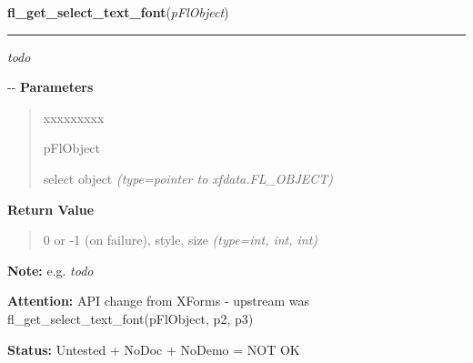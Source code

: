\hspace{.8\funcindent}\begin{boxedminipage}{\funcwidth}

    \raggedright \textbf{fl\_get\_select\_text\_font}(\textit{pFlObject})

    \vspace{-1.5ex}

    \rule{\textwidth}{0.5\fboxrule}
\setlength{\parskip}{2ex}

\emph{todo}

-{}-
\setlength{\parskip}{1ex}
      \textbf{Parameters}
      \vspace{-1ex}

      \begin{quote}
        \begin{Ventry}{xxxxxxxxx}

          \item[pFlObject]


select object
            {\it (type=pointer to xfdata.FL\_OBJECT)}

        \end{Ventry}

      \end{quote}

      \textbf{Return Value}
    \vspace{-1ex}

      \begin{quote}

0 or -1 (on failure), style, size
      {\it (type=int, int, int)}

      \end{quote}

\textbf{Note:} 
e.g. \emph{todo}


\textbf{Attention:} 
API change from XForms - upstream was
fl\_get\_select\_text\_font(pFlObject, p2, p3)


\textbf{Status:} 
Untested + NoDoc + NoDemo = NOT OK


    \end{boxedminipage}

    \label{xformslib:flselect:fl_set_select_text_font}

    \vspace{0.5ex}

